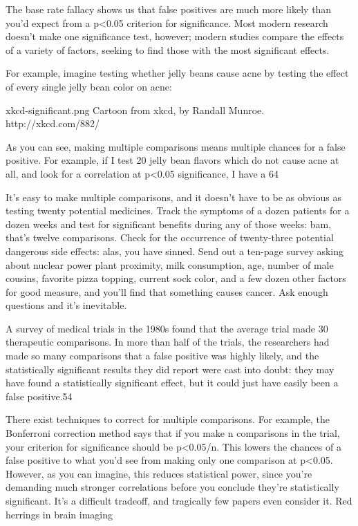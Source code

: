 The base rate fallacy shows us that false positives are much more likely than you’d expect from a p<0.05 criterion for significance. Most modern research doesn’t make one significance test, however; modern studies compare the effects of a variety of factors, seeking to find those with the most significant effects.

For example, imagine testing whether jelly beans cause acne by testing the effect of every single jelly bean color on acne:

xkcd-significant.png
Cartoon from xkcd, by Randall Munroe. http://xkcd.com/882/


As you can see, making multiple comparisons means multiple chances for a false positive. For example, if I test 20 jelly bean flavors which do not cause acne at all, and look for a correlation at p<0.05 significance, I have a 64%

It’s easy to make multiple comparisons, and it doesn’t have to be as obvious as testing twenty potential medicines. Track the symptoms of a dozen patients for a dozen weeks and test for significant benefits during any of those weeks: bam, that’s twelve comparisons. Check for the occurrence of twenty-three potential dangerous side effects: alas, you have sinned. Send out a ten-page survey asking about nuclear power plant proximity, milk consumption, age, number of male cousins, favorite pizza topping, current sock color, and a few dozen other factors for good measure, and you’ll find that something causes cancer. Ask enough questions and it’s inevitable.

A survey of medical trials in the 1980s found that the average trial made 30 therapeutic comparisons. In more than half of the trials, the researchers had made so many comparisons that a false positive was highly likely, and the statistically significant results they did report were cast into doubt: they may have found a statistically significant effect, but it could just have easily been a false positive.54

There exist techniques to correct for multiple comparisons. For example, the Bonferroni correction method says that if you make n comparisons in the trial, your criterion for significance should be p<0.05/n. This lowers the chances of a false positive to what you’d see from making only one comparison at p<0.05. However, as you can imagine, this reduces statistical power, since you’re demanding much stronger correlations before you conclude they’re statistically significant. It’s a difficult tradeoff, and tragically few papers even consider it.
Red herrings in brain imaging

